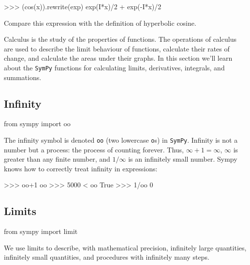 \small
\begin{verbatimtab}
>>> (cos(x)).rewrite(exp)
exp(I*x)/2 + exp(-I*x)/2
\end{verbatimtab} 
\normalsize

\noindent
Compare this expression with the definition of hyperbolic cosine. 

\label{sec:sympytut_calculus}

Calculus is the study of the properties of functions.
The operations of calculus are used to describe the limit behaviour of functions,
calculate their rates of change,
and calculate the areas under their graphs.
In this section we'll learn about the \texttt{SymPy} functions for calculating
limits, derivatives, integrals, and summations.

\subsection{Infinity}
\label{calculus:infinity}

\small
\begin{verbatimtab}
from sympy import oo
\end{verbatimtab}
\normalsize

\noindent
The infinity symbol is denoted \texttt{oo} (two lowercase \texttt{o}s) in \texttt{SymPy}.						
Infinity is not a number but a process: the process of counting forever.
Thus, $\infty + 1 = \infty$, 
$\infty$ is greater than any finite number,
and $1/\infty$ is an infinitely small number.
Sympy knows how to correctly treat infinity in expressions:

\small
\begin{verbatimtab}
>>> oo+1
oo
>>> 5000 < oo 
True
>>> 1/oo
0
\end{verbatimtab}
\normalsize

\subsection{Limits}
\label{calculus:limits}
\small
\begin{verbatimtab}
from sympy import limit
\end{verbatimtab}
\normalsize

\noindent
We use limits to describe, with mathematical precision, infinitely large quantities,						
infinitely small quantities, and procedures with infinitely many steps.

